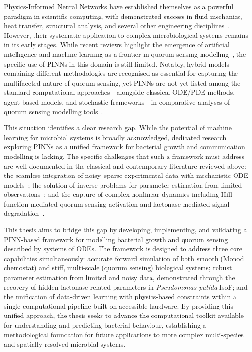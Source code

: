 \documentclass[14pt,a4paper,openany]{extbook}
\begin{document}
Physics-Informed Neural Networks have established themselves as a powerful paradigm in scientific computing, with demonstrated success in fluid mechanics, heat transfer, structural analysis, and several other engineering disciplines~\cite{cai2021, cuomo2022}. However, their systematic application to complex microbiological systems remains in its early stages. While recent reviews highlight the emergence of artificial intelligence and machine learning as a frontier in quorum sensing modelling~\cite{sadr2025pinn}, the specific use of PINNs in this domain is still limited. Notably, hybrid models combining different methodologies are recognised as essential for capturing the multifaceted nature of quorum sensing, yet PINNs are not yet listed among the standard computational approaches---alongside classical ODE/PDE methods, agent-based models, and stochastic frameworks---in comparative analyses of quorum sensing modelling tools~\cite{sadr2025pinn}.

This situation identifies a clear research gap. While the potential of machine learning for microbial systems is broadly acknowledged, dedicated research exploring PINNs as a unified framework for bacterial growth and communication modelling is lacking. The specific challenges that such a framework must address are well documented in the classical and contemporary literature reviewed above: the seamless integration of noisy, sparse experimental data with mechanistic ODE models~\cite{buddrus2014analysis}; the solution of inverse problems for parameter estimation from limited observations~\cite{baranyi1994}; and the capture of complex nonlinear dynamics including Hill-function-mediated quorum sensing activation and lactonase-mediated signal degradation~\cite{barbarossa2010delay}.

This thesis aims to bridge this gap by developing, implementing, and validating a PINN-based framework for modelling bacterial growth and quorum sensing described by systems of ODEs. The framework is designed to address three core capabilities simultaneously: accurate forward simulation of both smooth (Monod chemostat) and stiff, multi-scale (quorum sensing) biological systems; robust parameter estimation from limited and noisy data, demonstrated through the recovery of hidden lactonase-related parameters in \textit{Pseudomonas putida} IsoF; and the unification of data-driven learning with physics-based constraints within a single computational pipeline built on accessible hardware. By providing this unified approach, the thesis seeks to advance the computational toolkit available for understanding and predicting bacterial behaviour, establishing a methodological foundation for future applications to more complex multi-species and spatially resolved microbial systems.
\end{document}
